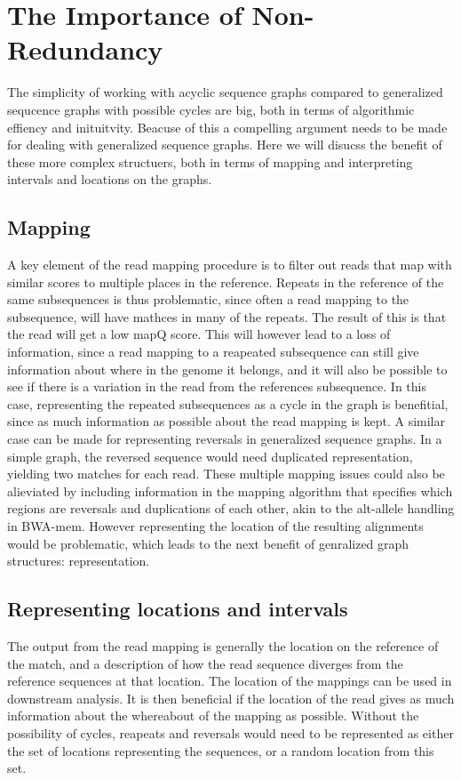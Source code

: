 





  \section{The Importance of Non-Redundancy}
  The simplicity of working with acyclic sequence graphs compared to generalized sequcence graphs with possible cycles are big, both in terms of algorithmic effiency and inituitvity.
  Beacuse of this a compelling argument needs to be made for dealing with generalized sequence graphs.
  Here we will disucss the benefit of these more complex structuers, both in terms of mapping and interpreting intervals and locations on the graphs. 
\subsection{Mapping}
  A key element of the read mapping procedure is to filter out reads that map with similar scores to multiple places in the reference.
  Repeats in the reference of the same subsequences is thus problematic, since often a read mapping to the subsequence, will have mathces in many of the repeats.
  The result of this is that the read will get a low mapQ score.
  This will however lead to a loss of information, since a read mapping to a reapeated subsequence can still give information about where in the genome it belongs, and it will also be possible to see if there is a variation in the read from the references subsequence. 
  In this case, representing the repeated subsequences as a cycle in the graph is benefitial, since as much information as possible about the read mapping is kept.
  A similar case can be made for representing reversals in generalized sequence graphs.
  In a simple graph, the reversed sequence would need duplicated representation, yielding two matches for each read.
  These multiple mapping issues could also be alieviated by including information in the mapping algorithm that specifies which regions are reversals and duplications of each other, akin to the alt-allele handling in BWA-mem.
  However representing the location of the resulting alignments would be problematic, which leads to the next benefit of genralized graph structures: representation.
  \subsection{Representing locations and intervals}
  The output from the read mapping is generally the location on the reference of the match, and a description of how the read sequence diverges from the reference sequences at that location.
  The location of the mappings can be used in downstream analysis.
  It is then beneficial if the location of the read gives as much information about the whereabout of the mapping as possible.
  Without the possibility of cycles, reapeats and reversals would need to be represented as either the set of locations representing the sequences, or a random location from this set.
